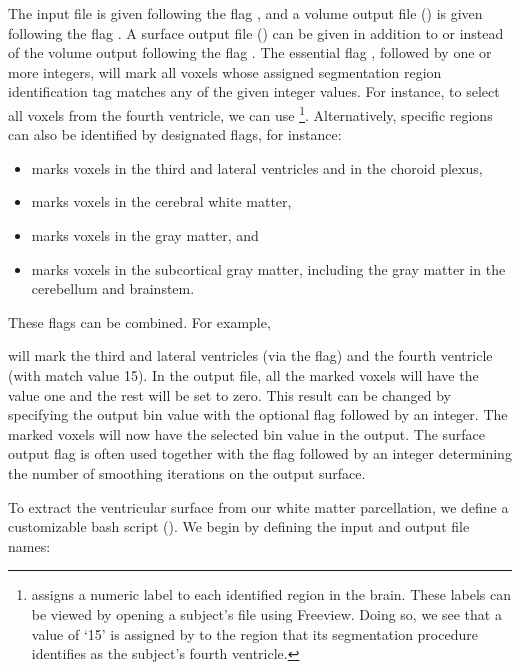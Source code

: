 The input file is given following the flag , and a volume
output file () is given following the flag . A
surface output file () can be given in addition to or
instead of the volume output following the flag . The
essential flag , followed by one or more integers, will mark
all voxels whose assigned segmentation region identification tag matches any of 
the given integer values. For instance, to select all voxels from the fourth 
ventricle, we can use \footnote{{\freesurfer} assigns a numeric 
label to each identified region in the brain. These labels can be viewed by opening a subject's  file 
using Freeview. Doing so, we see that a value of `15' is assigned by 
{\freesurfer} to the region that its segmentation procedure identifies as 
the subject's fourth ventricle.}. 
Alternatively, specific regions can 
also be identified by designated flags, for instance:
\begin{itemize}
\item {} marks voxels in the third and lateral ventricles and in the choroid plexus,
\item {} marks voxels in the cerebral white matter,
\item {} marks voxels in the gray matter, and  
\item {} marks voxels in the subcortical gray matter, including the gray matter in the cerebellum and brainstem. 
\end{itemize}
These flags can be combined. For example,

\noindent will mark the third and lateral ventricles (via the
 flag) and the fourth ventricle (with match value
15). In the output file, all the marked voxels will have the value one
and the rest will be set to zero. This result can be changed by specifying the
output bin value with the optional flag  followed by an
integer. The marked voxels will now have the selected bin value in the
output. The surface output flag  is often used together
with the flag  followed by an integer determining
the number of smoothing iterations on the output surface. 

To extract the ventricular surface from our white matter parcellation,
we define a customizable bash script (). We begin by defining the input and output file names:


